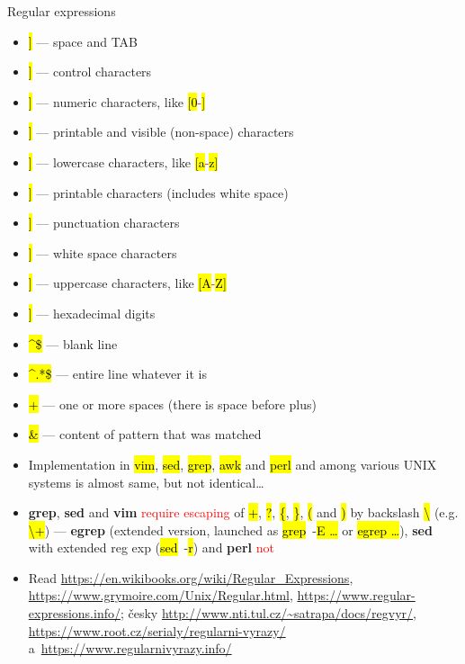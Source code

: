 \documentclass[compress, ucs, xelatex, 11pt, xcolor=svgnames, aspectratio=169,
	hyperref={
		bookmarks=true,
		unicode=true,
		colorlinks=true,
		pdftitle={Linux, command line and MetaCentrum},
		plainpages=false,
		pdfauthor={Vojtech Zeisek},
		pdfsubject={Course about use of Linux command line, writing shell scripts and using MetaCentrum of CESNET},
		pdfcreator={XeLaTeX},
		pdfkeywords={Linux, GNU, BASH, shell, command line, MetaCentrum},
		linkcolor=DarkRed, %
		anchorcolor=DarkBlue, %
		citecolor=Indigo, %
		filecolor=NavyBlue, %
		menucolor=DarkMagenta, %
		urlcolor=DarkBlue, %
		pdftex},
	url={hyphens, lowtilde} %
	]{beamer}
\renewcommand{\texttt}[1]{\hl{\ttfamily #1}}
\renewcommand{\alert}[1]{\textcolor{red}{#1}}
\begin{document}
\begin{frame}[allowframebreaks]{Regular expressions}
\begin{itemize}
		\item \alert{\texttt{[[:blank:]]}} --- space and TAB
		\item \alert{\texttt{[[:cntrl:]]}} --- control characters
		\item \alert{\texttt{[[:digit:]]}} --- numeric characters, like \alert{\texttt{[0}-\texttt{9]}}
		\item \alert{\texttt{[[:graph:]]}} --- printable and visible (non-space) characters
		\item \alert{\texttt{[[:lower:]]}} --- lowercase characters, like \alert{\texttt{[a}-\texttt{z]}}
		\item \alert{\texttt{[[:print:]]}} --- printable characters (includes white space)
		\item \alert{\texttt{[[:punct:]]}} --- punctuation characters
		\item \alert{\texttt{[[:space:]]}} --- white space characters
		\item \alert{\texttt{[[:upper:]]}} --- uppercase characters, like \alert{\texttt{[A}-\texttt{Z]}}
		\item \alert{\texttt{[[:xdigit:]]}} --- hexadecimal digits
		\item \alert{\texttt{\textasciicircum\$}} --- blank line
		\item \alert{\texttt{\textasciicircum.*\$}} --- entire line whatever it is
		\item \alert{\texttt{ +}} --- one or more spaces (there is space before plus)
		\item \alert{\texttt{\&}} --- content of pattern that was matched
		\item Implementation in \texttt{vim}, \texttt{sed}, \texttt{grep}, \texttt{awk} and \texttt{perl} and among various UNIX systems is almost same, but not identical\ldots
		\item \textbf{grep}, \textbf{sed} and \textbf{vim} \alert{require escaping} of \alert{\texttt{+}}, \alert{\texttt{?}}, \alert{\texttt{\{}}, \alert{\texttt{\}}}, \alert{\texttt{(}} and \alert{\texttt{)}} by backslash \alert{\texttt{\textbackslash}} (e.g. \texttt{\textbackslash +}) --- \textbf{egrep} (extended version, launched as \texttt{grep}~-\texttt{E \ldots} or \texttt{egrep \ldots}), \textbf{sed} with extended reg exp (\texttt{sed}~-\texttt{r}) and \textbf{perl} \alert{not}
		\item Read \url{https://en.wikibooks.org/wiki/Regular_Expressions}, \url{https://www.grymoire.com/Unix/Regular.html}, \url{https://www.regular-expressions.info/}; česky \url{http://www.nti.tul.cz/~satrapa/docs/regvyr/}, \url{https://www.root.cz/serialy/regularni-vyrazy/} a~\url{https://www.regularnivyrazy.info/}

\end{itemize}
\end{frame}
\end{document}
